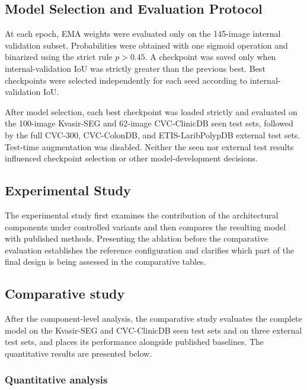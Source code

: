 \subsection{Model Selection and Evaluation Protocol}
\label{model-selection}

At each epoch, EMA weights were evaluated only on the 145-image internal
validation subset. Probabilities were obtained with one sigmoid operation and
binarized using the strict rule $p>0.45$. A checkpoint was saved only when
internal-validation IoU was strictly greater than the previous best. Best
checkpoints were selected independently for each seed according to
internal-validation IoU.

After model selection, each best checkpoint was loaded strictly and evaluated on the
100-image Kvasir-SEG and 62-image CVC-ClinicDB seen test sets, followed by the full
CVC-300, CVC-ColonDB, and ETIS-LaribPolypDB external test sets. Test-time
augmentation was disabled. Neither the seen nor external test results influenced
checkpoint selection or other model-development decisions.

\subsection{Experimental Study}\label{experimental-study}

The experimental study first examines the contribution of the architectural components
under controlled variants and then compares the resulting model with published methods.
Presenting the ablation before the comparative evaluation establishes the reference
configuration and clarifies which part of the final design is being assessed in the
comparative tables.



\subsection{Comparative study}\label{comparative-study}

After the component-level analysis, the comparative study evaluates the complete model
on the Kvasir-SEG and CVC-ClinicDB seen test sets and on three external test sets,
and places its performance alongside published baselines. The quantitative results
are presented below.

\subsubsection{Quantitative analysis}\label{quantitative-analysis}

